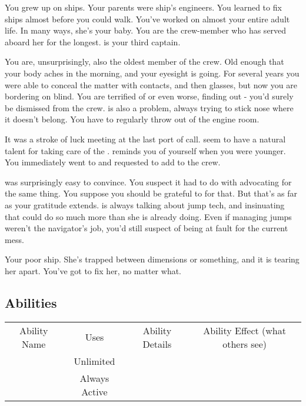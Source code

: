 \documentclass[char]{TMFHope}
\begin{document}
\name{\cEng{}}

You grew up on ships. Your parents were ship's engineers. You learned to fix ships almost before you could walk. You've worked on \pNew{} almost your entire adult life. In many ways, she's your baby. You are the crew-member who has served aboard her for the longest. \cCap{} is your third captain.

You are, unsurprisingly, also the oldest member of the crew. Old enough that your body aches in the morning, and your eyesight is going. For several years you were able to conceal the matter with contacts, and then glasses, but now you are bordering on blind. You are terrified of \cCap{} or even worse, \cXO{} finding out - you'd surely be dismissed from the crew. \cWeap{} is also a problem, always trying to stick \cWeap{\their} nose where it doesn't belong. You have to regularly throw \cWeap{\them} out of the engine room.

It was a stroke of luck meeting \cBoy{} at the last port of call. \cBoy{\They} seem\cBoy{\plural} to have a natural talent for taking care of the \pNew{}. \cBoy{} reminds you of yourself when you were younger. You immediately went to \cCap{} and requested to add \cBoy{} to the crew.

\cCap{} was surprisingly easy to convince. You suspect it had to do with \cNav{} advocating for the same thing. You suppose you should be grateful to \cNav{\them} for that. But that's as far as your gratitude extends. \cNav{} is always talking about jump tech, and insinuating that \pNew{} could do so much more than she is already doing. Even if managing jumps weren't the navigator's job, you'd still suspect \cNav{} of being at fault for the current mess.

Your poor ship. She's trapped between dimensions or something, and it is tearing her apart. You've got to fix her, no matter what.

\subsection{Abilities}
\begin{tabular}{ |c|c|c|c| } 
 \hline
 Ability Name & Uses & Ability Details & Ability Effect (what others see) \\ 
 \aEngineering{\MyName} & Unlimited & \aEngineering{\MYtext} & \aEngineering{\MYeffect} \\ 
 \aEyesight{\MyName} & Always Active & \aEyesight{\MYtext} & \aEyesight{\MYeffect}\\ 
 \hline
\end{tabular}
\end{document}

